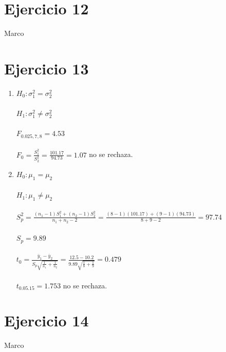 \documentclass[12pt,a4paper,table]{article}
\begin{document}
\section*{Ejercicio 12}
Marco

\section*{Ejercicio 13}
\begin{enumerate}[label=(\alph*)]
    \item
    $H_{0}: \sigma_{1}^{2}=\sigma_{2}^{2}$\\\\
$H_{1}: \sigma_{1}^{2} \neq \sigma_{2}^{2}$\\\\
$F_{0.025,7,8}=4.53$\\\\
$F_{0}=\frac{S_{1}^{2}}{S_{2}^{2}}=\frac{101.17}{94.73}=1.07$
no se rechaza. 
    \item
    		$H_{0}: \mu_{1}=\mu_{2}$\\\\
$H_{1}: \mu_{1} \neq \mu_{2}$\\\\
$S_{p}^{2}=\frac{\left(n_{1}-1\right) S_{1}^{2}+\left(n_{2}-1\right) S_{2}^{2}}{n_{1}+n_{2}-2}=\frac{(8-1)(101.17)+(9-1)(94.73)}{8+9-2}=97.74$\\\\
$S_{p}=9.89$\\\\
$t_{0}=\frac{\bar{y}_{1}-\bar{y}_{2}}{S_{p} \sqrt{\frac{1}{n_{1}}+\frac{1}{n_{2}}}}=\frac{12.5-10.2}{9.89 \sqrt{\frac{1}{8}+\frac{1}{9}}}=0.479$\\\\
$t_{0.05 .15}=1.753$
no se rechaza.
\end{enumerate}

\section*{Ejercicio 14}
Marco
\end{document}
